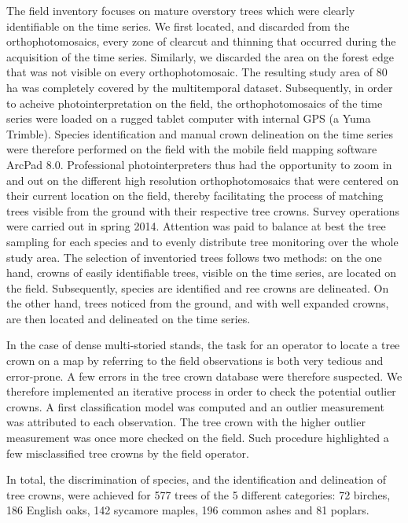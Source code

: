 \documentclass[remotesensing,article,submit,moreauthors,pdftex,12pt,a4paper]{mdpi} %
\begin{document}
The field inventory focuses on mature overstory trees which were clearly identifiable on the time series. 
We first located, and discarded from the orthophotomosaics, every zone of clearcut and thinning that occurred during the acquisition of the time series. 
Similarly, we discarded the area on the forest edge that was not visible on every orthophotomosaic. 
The resulting study area of 80 ha was completely covered by the multitemporal dataset. 
Subsequently, in order to acheive photointerpretation on the field, the orthophotomosaics of the time series were loaded on a rugged tablet computer with internal GPS (a Yuma Trimble\textsuperscript{\textregistered}). 
Species identification and manual crown delineation on the time series were therefore performed on the field with the mobile field mapping software ArcPad 8.0. 
Professional photointerpreters thus had the opportunity to zoom in and out on the different high resolution orthophotomosaics that were centered on their current location on the field, thereby facilitating the process of matching trees visible from the ground with their respective tree crowns. 
Survey operations were carried out in spring 2014.
Attention was paid to balance at best the tree sampling for each species and to evenly distribute tree monitoring over the whole study area. 
The selection of inventoried trees follows two methods: on the one hand, crowns of easily identifiable trees, visible on the time series, are located on the field. Subsequently, species are identified and ree crowns are delineated. 
On the other hand, trees noticed from the ground, and with well expanded crowns, are then located and delineated on the time series. 

In the case of dense multi-storied stands, the task for an operator to locate a tree crown on a map by referring to the field observations is both very tedious and error-prone. A few errors in the tree crown database were therefore suspected. 
We therefore implemented an iterative process in order to check the potential outlier crowns. 
A first classification model was computed and an outlier measurement was attributed to each observation. 
The tree crown with the higher outlier measurement was once more checked on the field. Such procedure highlighted a few misclassified tree crowns by the field operator.

In total, the discrimination of species, and the identification and delineation of tree crowns, were achieved for 577 trees of the 5 different categories: 72 birches, 186 English oaks, 142 sycamore maples, 196 common ashes and 81 poplars.
\end{document}
